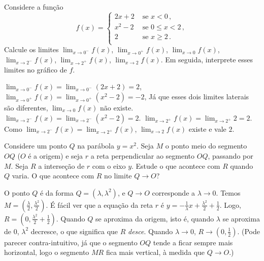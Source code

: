 \begin{exo}
Considere a função 
$$f(x)=
\begin{cases}
2x+2&\text{ se }x<0\,,\\
x^2-2&\text{ se }0\leq x<2\,,\\
2&\text{ se }x\geq 2\,.\\
\end{cases}
$$
Calcule os limites 
$\lim_{x\to 0^-}f(x)$,
$\lim_{x\to 0^+}f(x)$, $\lim_{x\to 0}f(x)$, $\lim_{x\to 2^-}f(x)$, $\lim_{x\to 2^+}f(x)$, 
$\lim_{x\to 2}f(x)$. Em seguida, interprete esses limites no gráfico de $f$.
\begin{sol}
$\lim_{x\to 0^-}f(x)=\lim_{x\to 0^-}(2x+2)=2$,
$\lim_{x\to 0^+}f(x)=\lim_{x\to 0^+}(x^2-2)=-2$,
Já que esses dois limites laterais são diferentes, $\lim_{x\to 0}f(x)$ não
existe.
$\lim_{x\to 2^-}f(x)=\lim_{x\to 2^-}(x^2-2)=2$.
$\lim_{x\to 2^+}f(x)=\lim_{x\to 2^+}2=2$. Como
$\lim_{x\to 2^-}f(x)=\lim_{x\to 2^+}f(x)$, $\lim_{x\to 2}f(x)$ existe e vale
$2$.
\begin{center}
\begin{bmlimage}\end{bmlimage}
\end{center}
\end{sol}
\end{exo}

\begin{exo}
Considere um ponto $Q$ na parábola $y=x^2$.
Seja $M$ o ponto meio do segmento $OQ$ ($O$ é a origem) e seja
$r$ a reta perpendicular ao segmento $OQ$, passando por $M$. Seja $R$
a interseção de $r$ com o eixo $y$. Estude o que acontece com $R$ quando
$Q$ varia. O que acontece com $R$ no limite $Q\to O$?
\begin{sol}
O ponto $Q$ é da forma $Q=(\lambda,\lambda^2)$, e $Q\to O$
corresponde a $\lambda\to 0$.
Temos $M=(\frac{\lambda}{2},\frac{\lambda^2}{2})$. 
É fácil ver que a equação da reta $r$ é 
$y=-\frac{1}{\lambda}x+\frac{\lambda^2}{2}+\frac12$. Logo,
$R=(0,\frac{\lambda^2}{2}+\frac12)$. Quando $Q$ se aproxima da origem,
isto é, quando $\lambda$ se aproxima de $0$, $\lambda^2$ decresce,
o que significa que $R$ \emph{desce}. Quando $\lambda\to 0$, $R\to
(0,\frac12)$. (Pode parecer contra-intuitivo, já que o segmento $OQ$ tende a
ficar sempre mais horizontal, logo o segmento $MR$ fica mais vertical, à medida
que $Q\to O$.)
\end{sol}
\end{exo}

